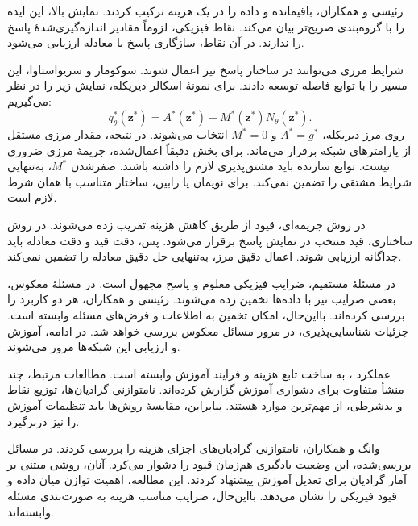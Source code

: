 رئیسی و همکاران، باقیمانده و داده را در یک هزینه ترکیب کردند.
نمایش بالا، این ایده را با گروه‌بندی صریح‌تر بیان می‌کند.
نقاط فیزیکی، لزوماً مقادیر اندازه‌گیری‌شدهٔ پاسخ را ندارند.
در آن نقاط، سازگاری پاسخ با معادله ارزیابی می‌شود.
\cite{Raissi2019PINN}

شرایط مرزی می‌توانند در ساختار پاسخ نیز اعمال شوند.
سوکومار و سریواستاوا، این مسیر را با توابع فاصله توسعه دادند.
برای نمونهٔ اسکالر دیریکله، نمایش زیر را در نظر می‌گیریم:
\begin{equation}
q_\theta^*(\mathbf z^*)
=A^*(\mathbf z^*)+M^*(\mathbf z^*)N_\theta(\mathbf z^*).
\label{eq:lit-pinn-hard-dirichlet}
\end{equation}
روی مرز دیریکله، $A^*=g^*$ و $M^*=0$ انتخاب می‌شوند.
در نتیجه، مقدار مرزی مستقل از پارامترهای شبکه برقرار می‌ماند.
برای بخش دقیقاً اعمال‌شده، جریمهٔ مرزی ضروری نیست.
توابع سازنده باید مشتق‌پذیری لازم را داشته باشند.
صفرشدن $M^*$، به‌تنهایی شرایط مشتقی را تضمین نمی‌کند.
برای نویمان یا رابین، ساختار متناسب با همان شرط لازم است.
\cite{SukumarSrivastava2022}

در روش جریمه‌ای، قیود از طریق کاهش هزینه تقریب زده می‌شوند.
در روش ساختاری، قید منتخب در نمایش پاسخ برقرار می‌شود.
پس، دقت قید و دقت معادله باید جداگانه ارزیابی شوند.
اعمال دقیق مرز، به‌تنهایی حل دقیق معادله را تضمین نمی‌کند.
\cite{SukumarSrivastava2022}

در مسئلهٔ مستقیم، ضرایب فیزیکی معلوم و پاسخ مجهول است.
در مسئلهٔ معکوس، بعضی ضرایب نیز با داده‌ها تخمین زده می‌شوند.
رئیسی و همکاران، هر دو کاربرد را بررسی کرده‌اند.
\cite{Raissi2019PINN}
بااین‌حال، امکان تخمین به اطلاعات و فرض‌های مسئله وابسته است.
جزئیات شناسایی‌پذیری، در مرور مسائل معکوس بررسی خواهد شد.
در ادامه، آموزش و ارزیابی این شبکه‌ها مرور می‌شوند.

\label{sec:lit-pinn-training-validation}

عملکرد ، به ساخت تابع هزینه و فرایند آموزش وابسته است.
مطالعات مرتبط، چند منشأ متفاوت برای دشواری آموزش گزارش کرده‌اند.
نامتوازنی گرادیان‌ها، توزیع نقاط و بدشرطی، از مهم‌ترین موارد هستند.
بنابراین، مقایسهٔ روش‌ها باید تنظیمات آموزش را نیز دربرگیرد.

وانگ و همکاران، نامتوازنی گرادیان‌های اجزای هزینه را بررسی کردند.
در مسائل بررسی‌شده، این وضعیت یادگیری هم‌زمان قیود را دشوار می‌کرد.
آنان، روشی مبتنی بر آمار گرادیان برای تعدیل آموزش پیشنهاد کردند.
این مطالعه، اهمیت توازن میان داده و قیود فیزیکی را نشان می‌دهد.
بااین‌حال، ضرایب مناسب هزینه به صورت‌بندی مسئله وابسته‌اند.
\cite{WangTengPerdikaris2021}


